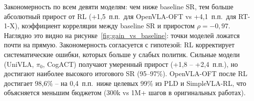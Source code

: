 \begin{table}[htbp]
\caption{SR (\%) до и после RL-дообучения, residual SAC + stage (серия~3).}
\label{tab:vla_rl_all}
\centering
\footnotesize
\setlength{\tabcolsep}{3pt}
\renewcommand{\arraystretch}{1.15}
\end{table}

    Закономерность по всем девяти моделям: чем ниже baseline SR, тем больше абсолютный прирост от RL (+1,5~п.п.\ для OpenVLA-OFT vs +4,1~п.п.\ для RT-1-X), коэффициент корреляции между baseline SR и приростом $\rho = -0{,}97$. Наглядно это видно на рисунке~\ref{fig:gain_vs_baseline}: точки моделей ложатся почти на прямую. Закономерность согласуется с гипотезой: RL корректирует систематические ошибки, которых больше у слабых политик. Сильные модели (UniVLA, $\pi_0$, CogACT) получают умеренный прирост (+1,8 -- +2,4~п.п.), но достигают наиболее высокого итогового SR (95--97\%). OpenVLA-OFT после RL достигает 98,6\% -- на 0,4~п.п.\ ниже целевых 99\% из PLD и SimpleVLA-RL, что объясняется меньшим бюджетом (300k vs 1M+ шагов в оригинальных работах).

